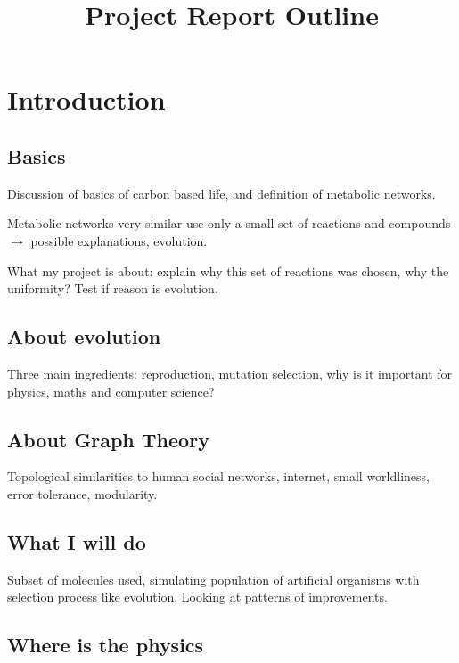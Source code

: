 \documentclass[]{article}
\title{Project Report Outline}
\author{}
\date{}
\begin{document}
\maketitle

\section{Introduction}
\label{sec:introduction}

\subsection{Basics}
\label{sub:basics}

Discussion of basics of carbon based life, and definition of metabolic networks.

Metabolic networks very similar use only a small set of reactions and compounds $\rightarrow$ possible explanations, evolution.

What my project is about: explain why this set of reactions was chosen, why the uniformity? Test if reason is evolution.

\subsection{About evolution}
\label{sub:About evolution}
Three main ingredients: reproduction, mutation selection, why is it important for physics, maths and computer science?

\subsection{About Graph Theory}
\label{sub:About Graph THeory}

Topological similarities to human social networks, internet, small worldliness, error tolerance, modularity. 

\subsection{What I will do}
\label{sub:What I will do}

Subset of molecules used, simulating population of artificial organisms with selection process like evolution. Looking at patterns of improvements.

\subsection{Where is the physics}
\label{sub:Where is the physics}
\end{document}
